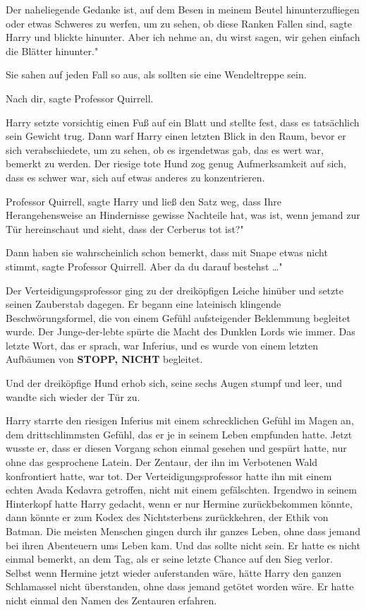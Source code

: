 \glqq Der naheliegende Gedanke ist, auf dem Besen in meinem Beutel
hinunterzufliegen oder etwas Schweres zu werfen, um zu sehen, ob diese Ranken
Fallen sind\grqq{}, sagte Harry und blickte hinunter. \glqq Aber ich nehme an,
du wirst sagen, wir gehen einfach die Blätter hinunter."

Sie sahen auf jeden Fall so aus, als sollten sie eine Wendeltreppe sein.

\glqq Nach dir\grqq{}, sagte Professor Quirrell.

Harry setzte vorsichtig einen Fuß auf ein Blatt und stellte fest, dass es
tatsächlich sein Gewicht trug. Dann warf Harry einen letzten Blick in den Raum,
bevor er sich verabschiedete, um zu sehen, ob es irgendetwas gab, das es wert
war, bemerkt zu werden. Der riesige tote Hund zog genug Aufmerksamkeit auf sich,
dass es schwer war, sich auf etwas anderes zu konzentrieren.

\glqq Professor Quirrell\grqq{}, sagte Harry und ließ den Satz weg, dass Ihre
Herangehensweise an Hindernisse gewisse Nachteile hat, \glqq was ist, wenn
jemand zur Tür hereinschaut und sieht, dass der Cerberus tot ist?"

\glqq Dann haben sie wahrscheinlich schon bemerkt, dass mit Snape etwas nicht
stimmt\grqq{}, sagte Professor Quirrell. \glqq Aber da du darauf bestehst …"

Der Verteidigungsprofessor ging zu der dreiköpfigen Leiche hinüber und setzte
seinen Zauberstab dagegen. Er begann eine lateinisch klingende
Beschwörungsformel, die von einem Gefühl aufsteigender Beklemmung begleitet
wurde. Der Junge-der-lebte spürte die Macht des Dunklen Lords wie immer. Das
letzte Wort, das er sprach, war \glqq Inferius\grqq{}, und es wurde von einem
letzten Aufbäumen von \textbf{STOPP, NICHT} begleitet.

Und der dreiköpfige Hund erhob sich, seine sechs Augen stumpf und leer, und
wandte sich wieder der Tür zu.

Harry starrte den riesigen Inferius mit einem schrecklichen Gefühl im Magen an,
dem drittschlimmsten Gefühl, das er je in seinem Leben empfunden hatte. Jetzt
wusste er, dass er diesen Vorgang schon einmal gesehen und gespürt hatte, nur
ohne das gesprochene Latein. Der Zentaur, der ihn im Verbotenen Wald
konfrontiert hatte, war tot. Der Verteidigungsprofessor hatte ihn mit einem
echten Avada Kedavra getroffen, nicht mit einem gefälschten. Irgendwo in seinem
Hinterkopf hatte Harry gedacht, wenn er nur Hermine zurückbekommen könnte, dann
könnte er zum Kodex des Nichtsterbens zurückkehren, der Ethik von Batman. Die
meisten Menschen gingen durch ihr ganzes Leben, ohne dass jemand bei ihren
Abenteuern ums Leben kam. Und das sollte nicht sein. Er hatte es nicht einmal
bemerkt, an dem Tag, als er seine letzte Chance auf den Sieg verlor. Selbst wenn
Hermine jetzt wieder auferstanden wäre, hätte Harry den ganzen Schlamassel nicht
überstanden, ohne dass jemand getötet worden wäre. Er hatte nicht einmal den
Namen des Zentauren erfahren.

